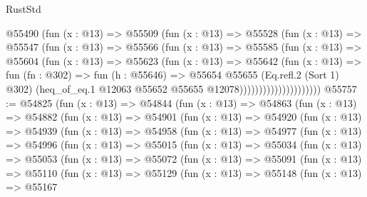 \begin{lexlean}{RustStd}
\begin{coremodule}
                        @55490
                          (fun (x : @13) =>
                          @55509
                            (fun (x : @13) =>
                            @55528
                              (fun (x : @13) =>
                              @55547
                                (fun (x : @13) =>
                                @55566
                                  (fun (x : @13) =>
                                  @55585
                                    (fun (x : @13) =>
                                    @55604
                                      (fun (x : @13) =>
                                      @55623
                                        (fun (x : @13) =>
                                        @55642
                                          (fun (x : @13) =>
                                          fun (fn : @302) =>
                                          fun (h : @55646) =>
                                          @55654
                                            @55655
                                            (Eq.refl.{2} (Sort 1) @302)
                                            (heq_of_eq.{1}
                                              @12063
                                              @55652
                                              @55655
                                              @12078)))))))))))))))))))))
@55757 := @54825
    (fun (x : @13) =>
    @54844
      (fun (x : @13) =>
      @54863
        (fun (x : @13) =>
        @54882
          (fun (x : @13) =>
          @54901
            (fun (x : @13) =>
            @54920
              (fun (x : @13) =>
              @54939
                (fun (x : @13) =>
                @54958
                  (fun (x : @13) =>
                  @54977
                    (fun (x : @13) =>
                    @54996
                      (fun (x : @13) =>
                      @55015
                        (fun (x : @13) =>
                        @55034
                          (fun (x : @13) =>
                          @55053
                            (fun (x : @13) =>
                            @55072
                              (fun (x : @13) =>
                              @55091
                                (fun (x : @13) =>
                                @55110
                                  (fun (x : @13) =>
                                  @55129
                                    (fun (x : @13) =>
                                    @55148
                                      (fun (x : @13) =>
                                      @55167

\end{coremodule}
\end{lexlean}
